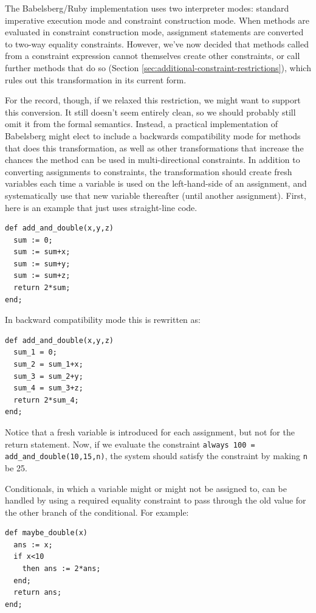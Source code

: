 \documentclass{article}
\begin{document}
The Babelsberg/Ruby implementation uses two interpreter modes:
standard imperative execution mode and constraint construction mode.
When methods are evaluated in constraint construction mode, assignment
statements are converted to two-way equality constraints.  However,
we've now decided that methods called from a constraint expression
cannot themselves create other constraints, or call further methods
that do so (Section \ref{sec:additional-constraint-restrictions}),
which rules out this transformation in its current form.

For the record, though, if we relaxed this restriction, we might want
to support this conversion.  It still doesn't seem entirely clean, so
we should probably still omit it from the formal semantics.  Instead,
a practical implementation of Babelsberg might elect to include a
backwards compatibility mode for methods that does this
transformation, as well as other transformations that increase the
chances the method can be used in multi-directional constraints.  In
addition to converting assignments to constraints, the transformation
should create fresh variables each time a variable is used on the
left-hand-side of an assignment, and systematically use that new
variable thereafter (until another assignment).  First, here is an
example that just uses straight-line code.

\begin{verbatim}
def add_and_double(x,y,z)
  sum := 0;
  sum := sum+x;
  sum := sum+y;
  sum := sum+z;
  return 2*sum;
end;
\end{verbatim}

In backward compatibility mode this is rewritten as:
\begin{verbatim}
def add_and_double(x,y,z)
  sum_1 = 0;
  sum_2 = sum_1+x;
  sum_3 = sum_2+y;
  sum_4 = sum_3+z;
  return 2*sum_4;
end;
\end{verbatim}

Notice that a fresh variable is introduced for each assignment, but
not for the return statement.  Now, if we evaluate the constraint 
\verb|always 100 = add_and_double(10,15,n)|, the system should satisfy
the constraint by making \verb|n| be 25.

Conditionals, in which a variable might or might not be assigned to,
can be handled by using a required equality constraint to pass
through the old value for the other branch of the conditional.  For
example:

\begin{verbatim}
def maybe_double(x)
  ans := x;
  if x<10
    then ans := 2*ans;
  end;
  return ans;
end;
\end{verbatim}
\end{document}
